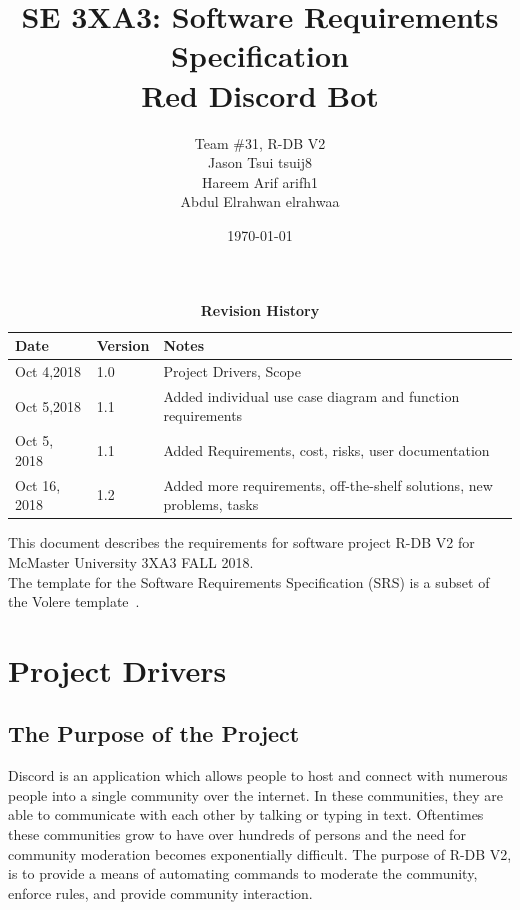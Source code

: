 \documentclass[12pt, titlepage]{article}
\title{SE 3XA3: Software Requirements Specification\\Red Discord Bot}
\author{Team \#31, R-DB V2
		\\ Jason Tsui tsuij8
		\\ Hareem Arif arifh1
		\\ Abdul Elrahwan elrahwaa
}
\date{\today}
\begin{document}
\maketitle

\tableofcontents
\listoftables
\listoffigures

\begin{table}[bp]
\caption{\bf Revision History}
\begin{tabularx}{\textwidth}{p{3cm}p{2cm}X}
\toprule {\bf Date} & {\bf Version} & {\bf Notes}\\
\midrule
Oct 4,2018 & 1.0 & Project Drivers, Scope\\
Oct 5,2018 & 1.1 & Added individual use case diagram and function requirements\\
Oct 5, 2018 & 1.1 & Added Requirements, cost, risks, user documentation \\
Oct 16, 2018 & 1.2 & Added more requirements, off-the-shelf solutions, new problems, tasks\\
\bottomrule
\end{tabularx}
\end{table}

\newpage


This document describes the requirements for software project R-DB V2 for McMaster University 3XA3 FALL 2018.\\

The template for the Software
Requirements Specification (SRS) is a subset of the Volere
template~\citep{RobertsonAndRobertson2012}.



\section{Project Drivers}

\subsection{The Purpose of the Project}
Discord is an application which allows people to host and connect with numerous people into a single community over the internet. In these communities, they are able to communicate with each other by talking or typing in text. Oftentimes these communities grow to have over hundreds of persons and the need for community moderation becomes exponentially difficult. The purpose of R-DB V2, is to provide a means of automating commands to moderate the community, enforce rules, and provide community interaction. 
\end{document}
